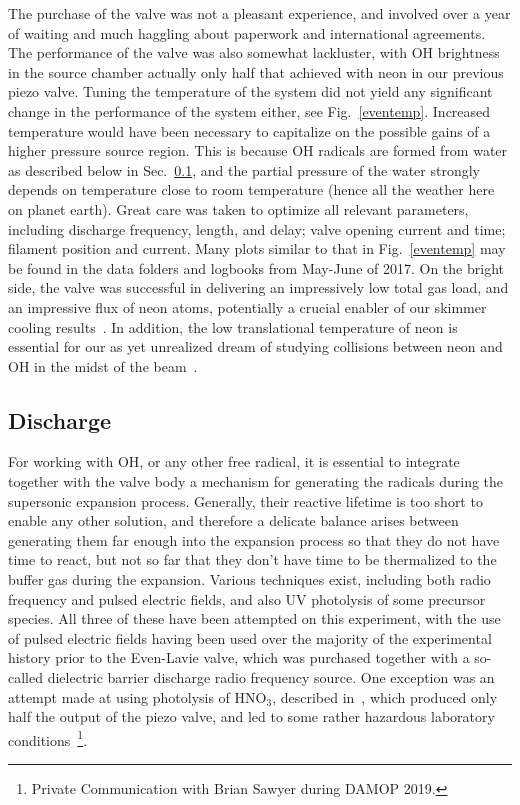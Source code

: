 The purchase of the valve was not a pleasant experience, and involved over a year of waiting and much haggling about paperwork and international agreements.
The performance of the valve was also somewhat lackluster, with OH brightness in the source chamber actually only half that achieved with neon in our previous piezo valve.
Tuning the temperature of the system did not yield any significant change in the performance of the system either, see Fig.~\ref{eventemp}.
Increased temperature would have been necessary to capitalize on the possible gains of a higher pressure source region.
This is because OH radicals are formed from water as described below in Sec.~\ref{secdisch}, and the partial pressure of the water strongly depends on temperature close to room temperature (hence all the weather here on planet earth).
Great care was taken to optimize all relevant parameters, including discharge frequency, length, and delay; valve opening current and time; filament position and current.
Many plots similar to that in Fig.~\ref{eventemp} may be found in the data folders and logbooks from May-June of 2017.
On the bright side, the valve was successful in delivering an impressively low total gas load, and an impressive flux of neon atoms, potentially a crucial enabler of our skimmer cooling results~\cite{Wu2018}.
In addition, the low translational temperature of neon is essential for our as yet unrealized dream of studying collisions between neon and OH in the midst of the beam~\citep[Chapter~7]{WuThesis2019}.

\subsection{Discharge}\label{secdisch}

For working with OH, or any other free radical, it is essential to integrate together with the valve body a mechanism for generating the radicals during the supersonic expansion process.
Generally, their reactive lifetime is too short to enable any other solution, and therefore a delicate balance arises between generating them far enough into the expansion process so that they do not have time to react, but not so far that they don't have time to be thermalized to the buffer gas during the expansion.
Various techniques exist, including both radio frequency and pulsed electric fields, and also UV photolysis of some precursor species.
All three of these have been attempted on this experiment, with the use of pulsed electric fields having been used over the majority of the experimental history prior to the Even-Lavie valve, which was purchased together with a so-called dielectric barrier discharge radio frequency source.
One exception was an attempt made at using photolysis of HNO$_3$, described in~\citep[Sec.~3.1.4.2]{SawyerThesis2010}, which produced only half the output of the piezo valve, and led to some rather hazardous laboratory conditions~\footnote{Private Communication with Brian Sawyer during DAMOP 2019.}\!.


